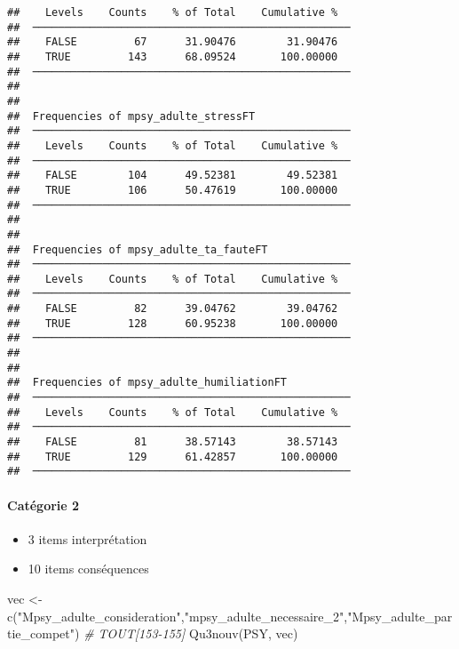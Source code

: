 \documentclass[
]{article}
\newenvironment{Shaded}{\begin{snugshade}}{\end{snugshade}}
\newcommand{\CommentTok}[1]{\textcolor[rgb]{0.56,0.35,0.01}{\textit{#1}}}
\newcommand{\FunctionTok}[1]{\textcolor[rgb]{0.00,0.00,0.00}{#1}}
\newcommand{\NormalTok}[1]{#1}
\newcommand{\OtherTok}[1]{\textcolor[rgb]{0.56,0.35,0.01}{#1}}
\newcommand{\StringTok}[1]{\textcolor[rgb]{0.31,0.60,0.02}{#1}}
\providecommand{\tightlist}{%
  \setlength{\itemsep}{0pt}\setlength{\parskip}{0pt}}
\begin{document}
\begin{verbatim}
##    Levels    Counts    % of Total    Cumulative %   
##  ────────────────────────────────────────────────── 
##    FALSE         67      31.90476        31.90476   
##    TRUE         143      68.09524       100.00000   
##  ────────────────────────────────────────────────── 
## 
## 
##  Frequencies of mpsy_adulte_stressFT                
##  ────────────────────────────────────────────────── 
##    Levels    Counts    % of Total    Cumulative %   
##  ────────────────────────────────────────────────── 
##    FALSE        104      49.52381        49.52381   
##    TRUE         106      50.47619       100.00000   
##  ────────────────────────────────────────────────── 
## 
## 
##  Frequencies of mpsy_adulte_ta_fauteFT              
##  ────────────────────────────────────────────────── 
##    Levels    Counts    % of Total    Cumulative %   
##  ────────────────────────────────────────────────── 
##    FALSE         82      39.04762        39.04762   
##    TRUE         128      60.95238       100.00000   
##  ────────────────────────────────────────────────── 
## 
## 
##  Frequencies of mpsy_adulte_humiliationFT           
##  ────────────────────────────────────────────────── 
##    Levels    Counts    % of Total    Cumulative %   
##  ────────────────────────────────────────────────── 
##    FALSE         81      38.57143        38.57143   
##    TRUE         129      61.42857       100.00000   
##  ──────────────────────────────────────────────────
\end{verbatim}

\hypertarget{catuxe9gorie-2-1}{%
\paragraph{Catégorie 2}\label{catuxe9gorie-2-1}}

\begin{itemize}
\tightlist
\item
  3 items interprétation
\item
  10 items conséquences
\end{itemize}

\begin{Shaded}
\begin{Highlighting}[]
\NormalTok{vec }\OtherTok{\textless{}{-}} \FunctionTok{c}\NormalTok{(}\StringTok{"Mpsy\_adulte\_consideration"}\NormalTok{,}\StringTok{"mpsy\_adulte\_necessaire\_2"}\NormalTok{,}\StringTok{"Mpsy\_adulte\_partie\_compet"}\NormalTok{)  }\CommentTok{\# TOUT[153{-}155]}
\FunctionTok{Qu3nouv}\NormalTok{(PSY, vec)}
\end{Highlighting}
\end{Shaded}
\end{document}
